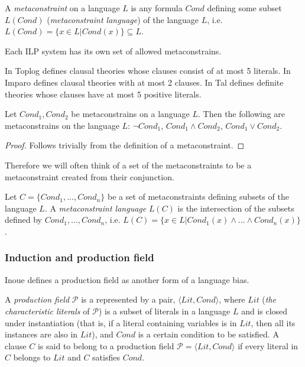 \begin{defn}
A \emph{metaconstraint} on a language $L$ is any formula $Cond$ defining some subset $L(Cond)$ (\emph{metaconstraint language}) of the language $L$, i.e. $L(Cond)=\{x \in L | Cond(x)\}\subseteq L$.
\end{defn}

Each ILP system has its own set of allowed metaconstrains.
\begin{exmp}
In Toplog  defines clausal theories whose clauses consist of at most 5 literals.
In Imparo  defines clausal theories with at most 2 clauses.
In Tal  defines definite theories whose clauses have at most 5 positive literals.
\end{exmp}

\begin{proposition}
Let $Cond_1, Cond_2$ be metaconstrains on a language $L$.
Then the following are metaconstrains on the language $L$:
$\neg Cond_1$, $Cond_1 \land Cond_2$, $Cond_1 \lor Cond_2$.
\end{proposition}

\begin{proof}
Follows trivially from the definition of a metaconstraint.
\end{proof}

Therefore we will often think of a set of the metaconstraints to be a metaconstraint created from their conjunction.

\begin{defn}
Let $C=\{Cond_1, ..., Cond_n\}$ be a set of metaconstraints defining subsets of the language $L$.
A \emph{metaconstraint language} $L(C)$ is the intersection of the subsets defined by $Cond_1, ..., Cond_n$,
i.e. $L(C)=\{x \in L | Cond_1(x) \land ... \land Cond_n(x) \}$.
\end{defn}

\subsubsection{Induction and production field}
Inoue defines a production field as another form of a language bias.

\begin{defn}\cite{inoue2004induction}
A \emph{production field} $\mathcal{P}$ is a represented by a pair,
$\langle Lit, Cond\rangle$, where $Lit$
(\emph{the characteristic literals} of $\mathcal{P}$) is a subset of literals in a language $L$ and is closed under instantiation (that is, if a literal containing variables is in $Lit$, then all its instances are also in $Lit$), and $Cond$ is a certain condition to be satisfied. 
A clause $C$ is said to belong to a production field $\mathcal{P} = \langle Lit, Cond \rangle$ if every literal in $C$ belongs to $Lit$ and $C$ satisfies $Cond$.
\end{defn}

